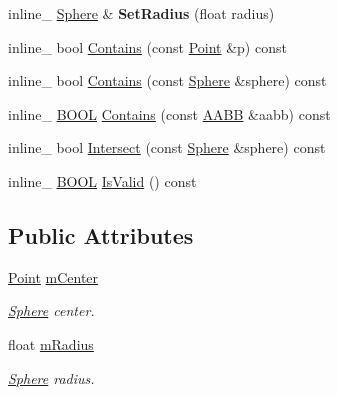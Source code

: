 \begin{DoxyCompactItemize}
\item 
inline\+\_\+ \hyperlink{classOpcode_1_1Sphere}{Sphere} \& {\bfseries Set\+Radius} (float radius)\hypertarget{classOpcode_1_1Sphere_ac326543fb77a7a51edb22d308e65457f}{}\label{classOpcode_1_1Sphere_ac326543fb77a7a51edb22d308e65457f}

\item 
inline\+\_\+ bool \hyperlink{classOpcode_1_1Sphere_abac2258179572e27ed545677b413c9f6}{Contains} (const \hyperlink{classOpcode_1_1Point}{Point} \&p) const 
\item 
inline\+\_\+ bool \hyperlink{classOpcode_1_1Sphere_aed0439e63079780da13ea1ba62f84c61}{Contains} (const \hyperlink{classOpcode_1_1Sphere}{Sphere} \&sphere) const 
\item 
inline\+\_\+ \hyperlink{IceTypes_8h_a050c65e107f0c828f856a231f4b4e788}{B\+O\+OL} \hyperlink{classOpcode_1_1Sphere_aedfda02c580f0d1fa14104bc06173504}{Contains} (const \hyperlink{classOpcode_1_1AABB}{A\+A\+BB} \&aabb) const 
\item 
inline\+\_\+ bool \hyperlink{classOpcode_1_1Sphere_a9f9e845259cc74c67ccb11bac9ab6f47}{Intersect} (const \hyperlink{classOpcode_1_1Sphere}{Sphere} \&sphere) const 
\item 
inline\+\_\+ \hyperlink{IceTypes_8h_a050c65e107f0c828f856a231f4b4e788}{B\+O\+OL} \hyperlink{classOpcode_1_1Sphere_a53b28bc1cfb70feab757de77940d4fc5}{Is\+Valid} () const 
\end{DoxyCompactItemize}
\subsection*{Public Attributes}
\begin{DoxyCompactItemize}
\item 
\hyperlink{classOpcode_1_1Point}{Point} \hyperlink{classOpcode_1_1Sphere_a48da4c5108e9efad10efa2f5471dface}{m\+Center}\hypertarget{classOpcode_1_1Sphere_a48da4c5108e9efad10efa2f5471dface}{}\label{classOpcode_1_1Sphere_a48da4c5108e9efad10efa2f5471dface}

\begin{DoxyCompactList}\small\item\em \hyperlink{classOpcode_1_1Sphere}{Sphere} center. \end{DoxyCompactList}\item 
float \hyperlink{classOpcode_1_1Sphere_a21acbd368c8d325a5816133e124c80ad}{m\+Radius}\hypertarget{classOpcode_1_1Sphere_a21acbd368c8d325a5816133e124c80ad}{}\label{classOpcode_1_1Sphere_a21acbd368c8d325a5816133e124c80ad}

\begin{DoxyCompactList}\small\item\em \hyperlink{classOpcode_1_1Sphere}{Sphere} radius. \end{DoxyCompactList}\end{DoxyCompactItemize}


